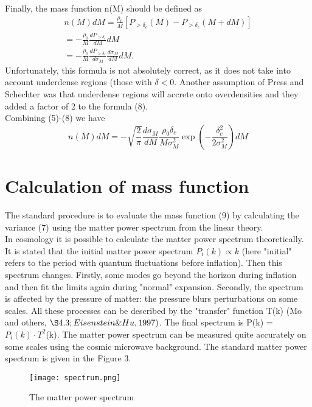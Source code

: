 \documentclass[11pt]{article}
\begin{document}
Finally, the mass function n(M) should be defined as
\begin{equation}
\begin{split}
n(M)dM = \frac{\rho_0}{M}[P_{> \delta_c} (M) - P_{> \delta_c} (M + dM)] \\ = - \frac{\rho_0}{M}\frac{dP_{> \delta_c}}{dM}dM \\ = - \frac{\rho_0}{M}\frac{dP_{> \delta_c}}{d \sigma_M} \frac{d\sigma_M}{dM}dM.
\end{split}
\end{equation}
Unfortunately, this formula is not absolutely correct, as it does not take into account underdense regions (those with $\delta<0$. Another assumption of Press and Schechter was that underdense regions will accrete onto overdensities and they added a factor of 2 to the formula (8).\\
Combining (5)-(8) we have 
\begin{equation}
n(M)dM = -\sqrt{\frac{2}{\pi}} \frac{d\sigma_M}{dM}\frac{\rho_0\delta_c}{M\sigma_{M}^{2}}\exp(-\frac{\delta_{c}^{2}}{2\sigma_{M}^{2}})dM
\end{equation}

\section{Calculation of mass function}
The standard procedure is to evaluate the mass function (9) by calculating the variance (7) using the matter power spectrum from the linear theory.\\
In cosmology it is possible to calculate the matter power spectrum theoretically. It is stated that the initial matter power spectrum $P_i(k)\propto k$ (here "initial" refers to the period with quantum fluctuations before inflation). Then this spectrum changes. Firstly, some modes go beyond the horizon during inflation and then fit the limits again during "normal" expansion. Secondly, the spectrum is affected by the pressure of matter: the pressure blurs perturbations on some scales. All these processes can be described by the "transfer" function T(k) (Mo and others, $\S 4.3; Eisenstein\&Hu, 1997)$. The final spectrum is P(k) = $P_i(k)\cdot T^2$(k). 
The matter power spectrum can be measured quite accurately on some scales using the cosmic microwave background. The standard matter power spectrum is given in the Figure 3.\\
\begin{figure}[H]
\centering
\texttt{[image: spectrum.png]}
\caption{The matter power spectrum}  
\end{figure}
\end{document}
